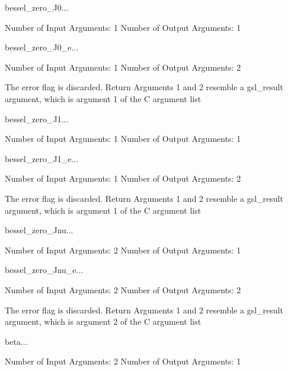 \begin{funcdesc}{bessel_zero_J0}{...}

    Number of Input  Arguments:  1
    Number of Output Arguments:  1
\end{funcdesc}

\begin{funcdesc}{bessel_zero_J0_e}{...}

    Number of Input  Arguments:  1
    Number of Output Arguments:  2

The error flag is discarded.
Return Arguments 1 and 2 resemble a gsl_result argument,
	which is  argument 1 of the C argument list

\end{funcdesc}

\begin{funcdesc}{bessel_zero_J1}{...}

    Number of Input  Arguments:  1
    Number of Output Arguments:  1
\end{funcdesc}

\begin{funcdesc}{bessel_zero_J1_e}{...}

    Number of Input  Arguments:  1
    Number of Output Arguments:  2

The error flag is discarded.
Return Arguments 1 and 2 resemble a gsl_result argument,
	which is  argument 1 of the C argument list

\end{funcdesc}

\begin{funcdesc}{bessel_zero_Jnu}{...}

    Number of Input  Arguments:  2
    Number of Output Arguments:  1
\end{funcdesc}

\begin{funcdesc}{bessel_zero_Jnu_e}{...}

    Number of Input  Arguments:  2
    Number of Output Arguments:  2

The error flag is discarded.
Return Arguments 1 and 2 resemble a gsl_result argument,
	which is  argument 2 of the C argument list

\end{funcdesc}

\begin{funcdesc}{beta}{...}

    Number of Input  Arguments:  2
    Number of Output Arguments:  1
\end{funcdesc}


